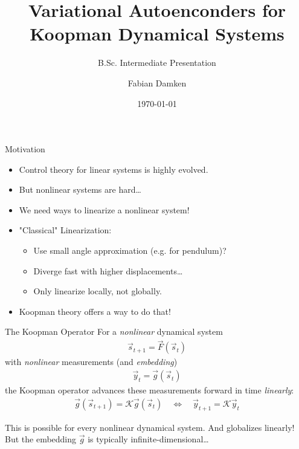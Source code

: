 \documentclass[
	aspectratio=43,
	color={accentcolor=1c},
	logo=false,
	colorframetitle=true
]{tudabeamer}
\title{Variational Autoenconders for Koopman Dynamical Systems}
\subtitle{B.Sc. Intermediate Presentation}
\author{Fabian Damken}
\institute{Intelligent Autonomous Systems}
\date{\today}
\begin{document}
	\maketitle

	\begin{frame}{Motivation}
		\begin{itemize}
			\item Control theory for linear systems is highly evolved.
			\item But nonlinear systems are hard\dots
			\item We need ways to linearize a nonlinear system!
			\item<2-> "Classical" Linearization:
				\begin{itemize}
					\item Use small angle approximation (e.g. for pendulum)?
					\item Diverge fast with higher displacements\dots
					\item Only linearize locally, not globally.
				\end{itemize}
			\item<3-> Koopman theory offers a way to do that!
		\end{itemize}
	\end{frame}

	\begin{frame}{The Koopman Operator}
		For a \emph{nonlinear} dynamical system
		\begin{align*}
			\vec{s}_{t + 1} = \vec{F}(\vec{s}_{t})
		\end{align*}
		with \emph{nonlinear} measurements (and \emph{embedding})
		\begin{align*}
			\vec{y}_t = \vec{g}(\vec{s}_t)
		\end{align*}
		the Koopman operator advances these measurements forward in time \emph{linearly}:
		\begin{align*}
			\vec{g}(\vec{s}_{t + 1}) = \mathcal{K} \vec{g}(\vec{s}_t)
			\quad\iff\quad
			\vec{y}_{t + 1} = \mathcal{K} \vec{y}_t
		\end{align*}

		This is possible for every nonlinear dynamical system. And globalizes linearly! But the embedding \(\vec{g}\) is typically infinite-dimensional\dots
	\end{frame}
\end{document}
